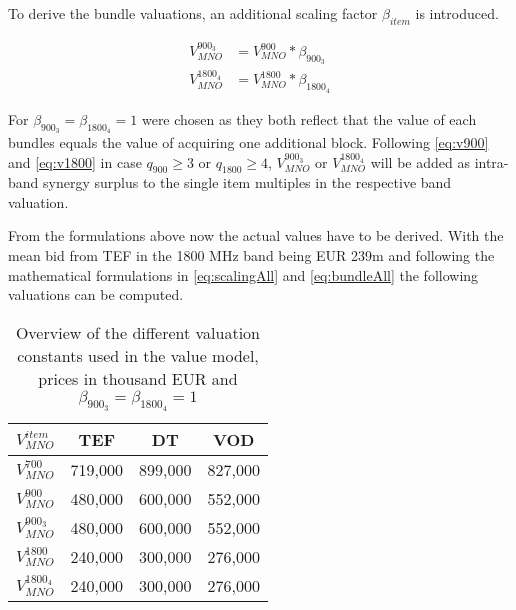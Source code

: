 To derive the bundle valuations, an additional scaling factor $ \beta_{item} $ is introduced.

\begin{subequations}
\label{eq:bundleAll}
\begin{align}
V_{MNO}^{900_{3}} &= V_{MNO}^{900} * \beta_{900_{3}} \label{eq:bundleScaling900} \\
V_{MNO}^{1800_{4}} &= V_{MNO}^{1800} * \beta_{1800_{4}}  \label{eq:bundleScaling1800}
\end{align}
\end{subequations}

For $ \beta_{900_{3}} = \beta_{1800_{4}} = 1 $ were chosen as they both reflect that the value of each bundles equals the value of acquiring one additional block. Following \autoref{eq:v900} and \autoref{eq:v1800} in case $  q_{900} \geq 3 $ or $ q_{1800} \geq 4  $, $ V_{MNO}^{900_{3}} $ or $ V_{MNO}^{1800_{4}} $ will be added as intra-band synergy surplus to the single item multiples in the respective band valuation.

From the formulations above now the actual values have to be derived. With the mean bid from TEF in the 1800 MHz band being EUR 239m and following the mathematical formulations in \autoref{eq:scalingAll} and \autoref{eq:bundleAll} the following valuations can be computed.

\begin{table}[ht]
\centering
\begin{tabular}{|l|l|l|l|}
\hline
\multicolumn{1}{|c|}{\textbf{$ V_{MNO}^{item} $}} & \multicolumn{1}{c|}{\textbf{TEF}} & \multicolumn{1}{c|}{\textbf{DT}} & \multicolumn{1}{c|}{\textbf{VOD}} \\ \hline
$ V_{MNO}^{700} $   & 719,000   & 899,000  & 827,000   \\ \hline
$ V_{MNO}^{900} $  & 480,000   & 600,000  & 552,000   \\ \hline
$ V_{MNO}^{900_{3}} $  & 480,000   & 600,000  & 552,000   \\ \hline
$ V_{MNO}^{1800} $  & 240,000   & 300,000  & 276,000   \\ \hline
$ V_{MNO}^{1800_{4}} $ & 240,000   & 300,000  & 276,000   \\ \hline
\end{tabular}
\caption{Overview of the different valuation constants used in the value model, prices in thousand EUR and $ \beta_{900_{3}} = \beta_{1800_{4}} = 1 $}
\label{tbl:valuationConstants}
\end{table}

